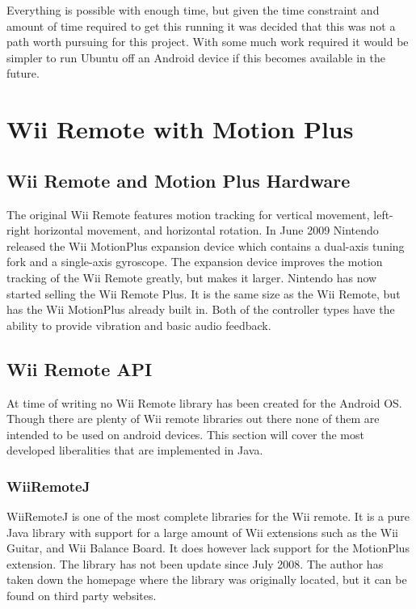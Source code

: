 \documentclass[11pt,twoside,a4paper]{report}
\begin{document}
Everything is possible with enough time, but given the time constraint and amount of time required to get this running it was decided that this was not a path worth pursuing for this project. With some much work required it would be simpler to run Ubuntu off an Android device if this becomes available in the future. %

\section{Wii Remote with Motion Plus}

\subsection{Wii Remote and Motion Plus Hardware}
The original Wii Remote features motion tracking for vertical movement, left-right horizontal movement, and horizontal rotation. %
In June 2009 %
Nintendo released the Wii MotionPlus expansion device which contains a dual-axis tuning fork and a single-axis gyroscope. %
The expansion device improves the motion tracking of the Wii Remote greatly, but makes it larger. Nintendo has now started selling the Wii Remote Plus. It is the same size as the Wii Remote, but has the Wii MotionPlus already built in. Both of the controller types have the ability to provide vibration and basic audio feedback.


\subsection{Wii Remote API}
At time of writing no Wii Remote library has been created for the Android OS. Though there are plenty of Wii remote libraries out there none of them are intended to be used on android devices. This section will cover the most developed liberalities that are implemented in Java.

\subsubsection{WiiRemoteJ}
WiiRemoteJ is one of the most complete libraries for the Wii remote. It is a pure Java library with support for a large amount of Wii extensions such as the Wii Guitar, and Wii Balance Board. It does however lack support for the MotionPlus extension. The library has not been update since July 2008. The author has taken down the homepage where the library was originally located, but it can be found on third party websites. \cite{WiiRemoteJ}
\end{document}
